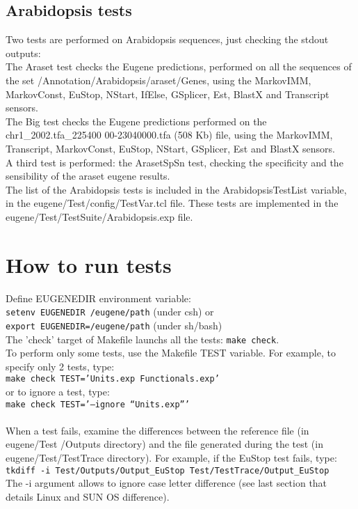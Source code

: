 \documentclass[a4paper,11pt]{article}
\begin{document}
\subsection{Arabidopsis tests}
Two tests are performed on Arabidopsis sequences, just checking the stdout outputs:\\
The Araset test checks the Eugene predictions, performed on all the sequences of the set /Annotation/Arabidopsis/araset/Genes, using the MarkovIMM, MarkovConst, EuStop, NStart, IfElse, GSplicer, Est, BlastX and Transcript sensors.\\
The Big test checks the Eugene predictions performed on the chr1\_2002.tfa\_225400
00-23040000.tfa (508 Kb) file, using the MarkovIMM, Transcript, MarkovConst, EuStop, NStart, GSplicer, Est and BlastX sensors.\\
A third test is performed: the ArasetSpSn test, checking the specificity and the sensibility of the araset eugene results.\\
The list of the Arabidopsis tests is included in the ArabidopsisTestList variable, in the eugene/Test/config/TestVar.tcl file. These tests are implemented in the eugene/Test/TestSuite/Arabidopsis.exp file.\\ 

\section{How to run tests}

Define EUGENEDIR environment variable: \\
{\tt \small setenv EUGENEDIR /eugene/path} (under csh) or \\
{\tt \small export EUGENEDIR=/eugene/path} (under sh/bash) \\

The 'check' target of Makefile launchs all the tests: {\tt \small make check}.\\
To perform only some tests, use the Makefile TEST variable.
For example, to specify only 2 tests, type: \\
{\tt \small make check TEST='Units.exp Functionals.exp'} \\
or to ignore a test, type: \\
{\tt \small make check TEST='--ignore ``Units.exp'''}\\
\\
When a test fails, examine the differences between the reference file (in eugene/Test
/Outputs directory) and the file generated during the test (in eugene/Test/TestTrace directory).
For example, if the EuStop test fails, type: \\
{\tt \small tkdiff -i Test/Outputs/Output\_EuStop Test/TestTrace/Output\_EuStop}\\
The -i argument allows to ignore case letter difference (see last section that details Linux and SUN OS difference).
\end{document}
